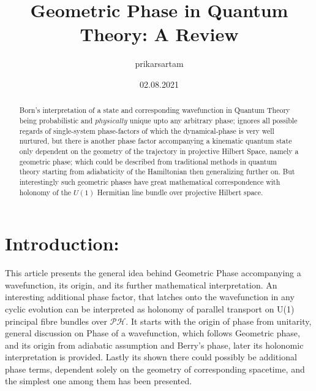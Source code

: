 \documentclass[8pt, twocoloumn]{article}
\title{\textbf{Geometric Phase in Quantum Theory: 
    A Review}}
\author{prikarsartam}
\date{02.08.2021}
\begin{document}
\newtheorem*{theorem}{Definition}
\newtheorem*{axiom1}{Axiom 1}
\newtheorem*{axiom4}{Axiom 4}
\newtheorem*{definition1}{Adiabatic Evolution}
\newcommand\sbullet[1][.5]{\mathbin{\vcenter{\hbox{\scalebox{#1}{$\bullet$}}}}}


\maketitle

\begin{abstract}
Born's interpretation of a state and corresponding wavefunction in Quantum Theory being probabilistic and $physically$ unique upto any arbitrary phase; ignores all possible regards of single-system phase-factors of which the dynamical-phase is very well nurtured, but there is another phase factor accompanying a kinematic quantum state only dependent on the geometry of the trajectory in projective Hilbert Space, namely a geometric phase; which could be described from traditional methods in quantum theory starting from adiabaticity of the Hamiltonian then generalizing further on. But interestingly such geometric phases have great mathematical correspondence with holonomy of the $U(1)$ Hermitian line bundle over projective Hilbert space. 
\end{abstract} 





\section{Introduction:}

This article presents the general idea behind Geometric Phase accompanying a wavefunction, its origin, and its further mathematical interpretation. An interesting additional phase factor, that latches onto the wavefunction in any cyclic evolution can be interpreted as holonomy of parallel transport on U(1) principal fibre bundles over $\mathcal{PH}$. It starts with the origin of phase from unitarity, general discussion on Phase of a wavefunction, which follows Geometric phase, and its origin from adiabatic assumption and Berry's phase, later its holonomic interpretation is provided. Lastly its shown there could possibly be additional phase terms, dependent solely on the geometry of corresponding spacetime, and the simplest one among them has been presented. 
\end{document}
